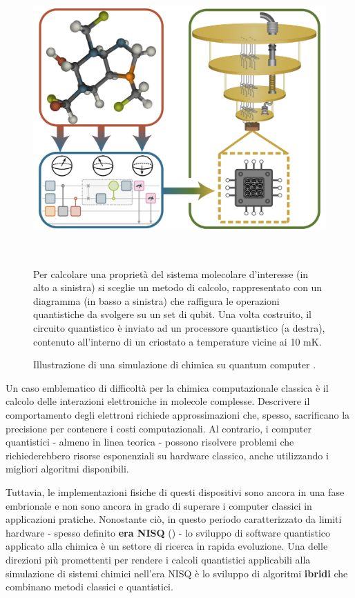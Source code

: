 \begin{figure}[H]
    \centering
    \begin{minipage}{\linewidth}
        \centering
        \includegraphics[width=.5\linewidth]{Immagini/Capitolo_0/qpu_chemistry.png}
        \caption{Illustrazione di una simulazione di chimica su quantum computer \cite{weidman_2024}.}
        \label{fig:qpu-chemistry}
    \end{minipage} \\[1ex]
    \begin{minipage}{.854\linewidth}
        \footnotesize
        Per calcolare una proprietà del sistema molecolare d'interesse (in alto a sinistra) si sceglie un metodo di calcolo, rappresentato con un diagramma (in basso a sinistra) che raffigura le operazioni quantistiche da svolgere su un set di qubit. Una volta costruito, il circuito quantistico è inviato ad un processore quantistico (a destra), contenuto all'interno di un criostato a temperature vicine ai 10 mK.
    \end{minipage}
\end{figure}

Un caso emblematico di difficoltà per la chimica computazionale classica è il calcolo delle interazioni elettroniche in molecole complesse. Descrivere il comportamento degli elettroni richiede approssimazioni che, spesso, sacrificano la precisione per contenere i costi computazionali. Al contrario, i computer quantistici - almeno in linea teorica - possono risolvere problemi che richiederebbero risorse esponenziali su hardware classico, anche utilizzando i migliori algoritmi disponibili.

Tuttavia, le implementazioni fisiche di questi dispositivi sono ancora in una fase embrionale e non sono ancora in grado di superare i computer classici in applicazioni pratiche. Nonostante ciò, in questo periodo caratterizzato da limiti hardware - spesso definito \textbf{era NISQ} () - lo sviluppo di software quantistico applicato alla chimica è un settore di ricerca in rapida evoluzione. Una delle direzioni più promettenti per rendere i calcoli quantistici applicabili alla simulazione di sistemi chimici nell'era NISQ è lo sviluppo di algoritmi \textbf{ibridi} che combinano metodi classici e quantistici.

